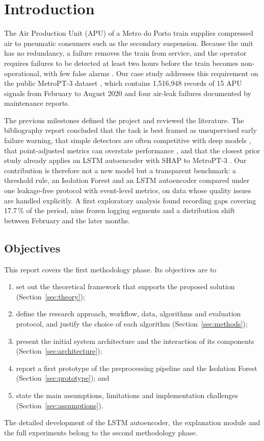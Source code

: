 \newcommand{\pending}[1]{\textcolor{red}{[#1]}}

\section{Introduction}
\label{sec:intro}

The Air Production Unit (APU) of a Metro do Porto train supplies compressed air to pneumatic consumers such as the secondary suspension. Because the unit has no redundancy, a failure removes the train from service, and the operator requires failures to be detected at least two hours before the train becomes non-operational, with few false alarms \citep{veloso2022metropt}. Our case study addresses this requirement on the public MetroPT-3 dataset \citep{davari2021metropt3data}, which contains 1{,}516{,}948 records of 15 APU signals from February to August 2020 and four air-leak failures documented by maintenance reports.

The previous milestones defined the project and reviewed the literature. The bibliography report concluded that the task is best framed as unsupervised early failure warning, that simple detectors are often competitive with deep models \citep{schmidl2022anomaly}, that point-adjusted metrics can overstate performance \citep{kim2022rigorous}, and that the closest prior study already applies an LSTM autoencoder with SHAP to MetroPT-3 \citep{davari2024explaining}. Our contribution is therefore not a new model but a transparent benchmark: a threshold rule, an Isolation Forest and an LSTM autoencoder compared under one leakage-free protocol with event-level metrics, on data whose quality issues are handled explicitly. A first exploratory analysis found recording gaps covering 17.7\,\% of the period, nine frozen logging segments and a distribution shift between February and the later months.

\subsection{Objectives}
This report covers the first methodology phase. Its objectives are to
\begin{enumerate}[itemsep=2pt]
  \item set out the theoretical framework that supports the proposed solution (Section~\ref{sec:theory});
  \item define the research approach, workflow, data, algorithms and evaluation protocol, and justify the choice of each algorithm (Section~\ref{sec:methods});
  \item present the initial system architecture and the interaction of its components (Section~\ref{sec:architecture});
  \item report a first prototype of the preprocessing pipeline and the Isolation Forest (Section~\ref{sec:prototype}); and
  \item state the main assumptions, limitations and implementation challenges (Section~\ref{sec:assumptions}).
\end{enumerate}
The detailed development of the LSTM autoencoder, the explanation module and the full experiments belong to the second methodology phase.

